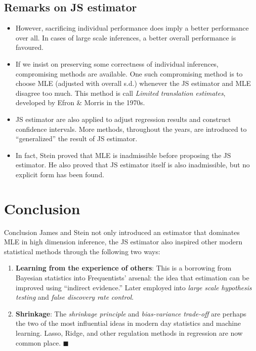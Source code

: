 \documentclass{beamer}
\begin{document}
\subsection{Remarks on JS estimator}

\begin{frame}{}
	\begin{itemize}
		\item
			However, sacrificing individual performance does imply a better
			performance over all.  In cases of large scale inferences, a better
			overall performance is favoured.
		\item
			If we insist on preserving some correctness of individual
			inferences, compromising methods are available.  One such
			compromising method is to choose MLE (adjusted with overall s.d.)
			whenever the JS estimator and MLE disagree too much.
			This method is call \emph{Limited translation estimates},
			developed by Efron \& Morris in the 1970s.
		\item
			JS estimator are also applied to adjust regression results and
			construct confidence intervals.  More methods, throughout the
			years, are introduced to ``generalized'' the result of JS
			estimator.
		\item
			In fact, Stein proved that MLE is inadmissible before proposing
			the JS estimator.
			He also proved that JS estimator itself is also inadmissible,
			but no explicit form has been found.
	\end{itemize}
\end{frame}

\section{Conclusion}

\begin{frame}{Conclusion}
	James and Stein not only introduced an estimator that dominates MLE in high
	dimension inference, the JS estimator also inspired other modern
	statistical methods through the following two ways:
	\begin{enumerate}
		\item \textbf{Learning from the experience of others}:
			This is a borrowing from Bayesian statistics into Frequentists'
			arsenal: the idea that estimation can be improved using
			``indirect evidence.''
			Later employed into \emph{large scale hypothesis testing} and
			\emph{false discovery rate control}.
		\item \textbf{Shrinkage}:
			The \emph{shrinkage principle} and \emph{bias-variance trade-off}
			are perhaps the two of the most influential ideas in modern day
			statistics and machine learning.  Lasso, Ridge, and other
			regulation methods in regression are now common place.
			\hfill$\blacksquare$
	\end{enumerate}
\end{frame}
\end{document}
